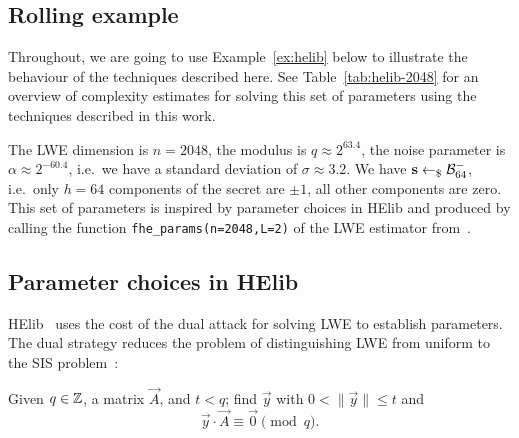 \documentclass[a4paper]{llncs}
\begin{document}
\subsection{Rolling example}\label{sec:rolling-example}

Throughout, we are going to use Example~\ref{ex:helib} below to illustrate the behaviour of the techniques described here. See Table~\ref{tab:helib-2048} for an overview of complexity estimates for solving this set of parameters using the techniques described in this work.

\begin{example}\label{ex:helib}
  The LWE dimension is $n=2048$, the modulus is $q ≈ 2^{63.4}$, the noise parameter is $\alpha ≈ 2^{-60.4}$, i.e.\ we have a standard deviation of $σ ≈ 3.2$. We have $\s \sample \B[64]{-}$, i.e.\ only $h=64$ components of the secret are $\pm 1$, all other components are zero. This set of parameters is inspired by parameter choices in  HElib and produced by calling the function \lstinline[]{fhe_params(n=2048,L=2)} of the LWE estimator from~\cite{JMC:AlbPlaSco15}.
\end{example}

\begin{comment}
  sage: print cost_str(sis(n, alpha, q, optimisation_target="lp"))
  sage: print cost_str(sis(n, alpha, q, optimisation_target="sieve"))
  sage: print cost_str(sis_small_secret_mod_switch(n, alpha, q, optimisation_target="sieve", h=64, secret_bounds=(-1,1), use_lll=True))
  sage: print cost_str(drop_and_solve(sis, n, alpha, q, optimisation_target="sieve", secret_bounds=(-1,1), h=64, postprocess=True))
  sage: print cost_str(drop_and_solve(sis_small_secret_mod_switch, n, alpha, q, optimisation_target="sieve", secret_bounds=(-1,1), h=64, postprocess=True))
\end{comment}

\subsection{Parameter choices in HElib}\label{sec:parameters-helib}

HElib~\cite{C:GenHalSma12,C:HalSho14} uses the cost of the dual attack for solving LWE to establish parameters. The dual strategy reduces the problem of distinguishing LWE from uniform to the SIS problem~\cite{STOC:Ajtai96}:

\begin{definition}[SIS]
Given \(q \in \ZZ\), a matrix \(\vec{A}\), and \(t < q\); find \(\vec{y}\) with \(0 < \| \vec{y} \| \leq t\) and \[\vec{y} ⋅ \vec{A} ≡ \vec{0} \pmod{q}.\]
\end{definition}
\end{document}
